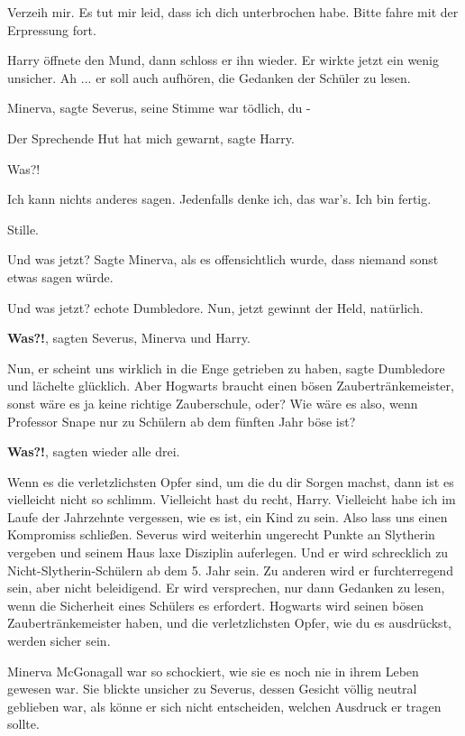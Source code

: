 \glqq Verzeih mir. Es tut mir leid, dass ich dich unterbrochen habe. Bitte fahre
mit der Erpressung fort.\grqq{}

Harry öffnete den Mund, dann schloss er ihn wieder. Er wirkte jetzt ein wenig
unsicher. \glqq Ah ... er soll auch aufhören, die Gedanken der Schüler zu
lesen.\grqq{}

\glqq Minerva\grqq{}, sagte Severus, seine Stimme war tödlich, \glqq du -\grqq{}

\glqq Der Sprechende Hut hat mich gewarnt\grqq{}, sagte Harry.

\glqq Was?!\grqq{}

\glqq Ich kann nichts anderes sagen. Jedenfalls denke ich, das war's. Ich bin
fertig.\grqq{}

Stille.

\glqq Und was jetzt?\grqq{} Sagte Minerva, als es offensichtlich wurde, dass
niemand sonst etwas sagen würde.

\glqq Und was jetzt?\grqq{} echote Dumbledore. \glqq Nun, jetzt gewinnt der
Held, natürlich.\grqq{}

\glqq \textbf{Was?!}\grqq{}, sagten Severus, Minerva und Harry.

\glqq Nun, er scheint uns wirklich in die Enge getrieben zu haben\grqq{}, sagte
Dumbledore und lächelte glücklich. \glqq Aber Hogwarts braucht einen bösen
Zaubertränkemeister, sonst wäre es ja keine richtige Zauberschule, oder? Wie
wäre es also, wenn Professor Snape nur zu Schülern ab dem fünften Jahr böse
ist?\grqq{}

\glqq \textbf{Was?!}\grqq{}, sagten wieder alle drei.

\glqq Wenn es die verletzlichsten Opfer sind, um die du dir Sorgen machst, dann
ist es vielleicht nicht so schlimm. Vielleicht hast du recht, Harry. Vielleicht
habe ich im Laufe der Jahrzehnte vergessen, wie es ist, ein Kind zu sein. Also
lass uns einen Kompromiss schließen. Severus wird weiterhin ungerecht Punkte an
Slytherin vergeben und seinem Haus laxe Disziplin auferlegen. Und er wird
schrecklich zu Nicht-Slytherin-Schülern ab dem 5. Jahr sein. Zu anderen wird er
furchterregend sein, aber nicht beleidigend. Er wird versprechen, nur dann
Gedanken zu lesen, wenn die Sicherheit eines Schülers es erfordert. Hogwarts
wird seinen bösen Zaubertränkemeister haben, und die verletzlichsten Opfer, wie
du es ausdrückst, werden sicher sein.\grqq{}

Minerva McGonagall war so schockiert, wie sie es noch nie in ihrem Leben gewesen
war. Sie blickte unsicher zu Severus, dessen Gesicht völlig neutral geblieben
war, als könne er sich nicht entscheiden, welchen Ausdruck er tragen sollte.

